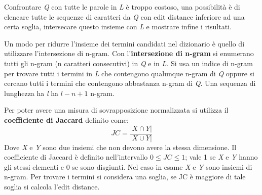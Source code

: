 \documentclass[10pt, a4paper]{report}
\begin{document}
Confrontare \textit{Q} con tutte le parole in \textit{L} è troppo costoso, una possibilità è di elencare tutte le sequenze di caratteri da \textit{Q} con edit distance inferiore ad una certa soglia, intersecare questo insieme con \textit{L} e mostrare infine i risultati.

Un modo per ridurre l'insieme dei termini candidati nel dizionario è quello di utilizzare l'intersezione di n-gram. Con l'\textbf{intersezione di n-gram} si enumerano tutti gli n-gram (n caratteri consecutivi) in \textit{Q} e in \textit{L}. Si usa un indice di n-gram per trovare tutti i termini in \textit{L} che contengono qualunque n-gram di \textit{Q} oppure si cercano tutti i termini che contengono abbastanza n-gram di \textit{Q}. Una sequenza di lunghezza ha \textit{l} ha $l - n + 1$ n-gram.

Per poter avere una misura di sovrapposizione normalizzata si utilizza il \textbf{coefficiente di Jaccard} definito come:
\begin{equation*}
JC = \frac{|X \cap Y|}{|X \cup Y|}
\end{equation*}
Dove \textit{X} e \textit{Y} sono due insiemi che non devono avere la stessa dimensione. Il coefficiente di Jaccard è definito nell'intervallo $0 \leq JC \leq 1$; vale 1 se \textit{X} e \textit{Y} hanno gli stessi elementi e 0 se sono disgiunti. Nel caso in esame \textit{X} e \textit{Y} sono insiemi di n-gram. Per trovare i termini si considera una soglia, se JC è maggiore di tale soglia si calcola l'edit distance.
\end{document}
